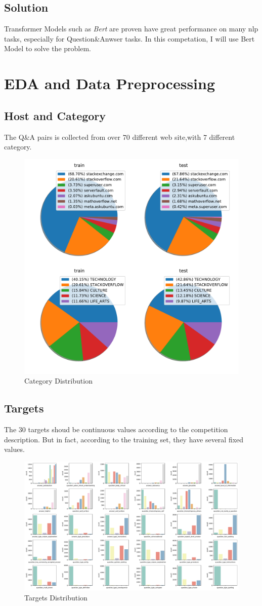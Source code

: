 \subsection{Solution}
Transformer Models such as \textit{Bert} are proven have great performance on many nlp tasks, especially for Question\&Anwser tasks.
In this competation, I will use Bert Model to solve the problem.
\newpage
\section{EDA and Data Preprocessing} \label{sec-eda}
\subsection{Host and Category}
The Q\&A pairs is collected from over 70 different web site,with 7 different category.
\begin{figure}[htbp]
    \centering
    \includegraphics[width=.5\linewidth]{figures/hosts_categories.pdf}
    \caption{Category Distribution}
    \label{fig:categories}
\end{figure}
\subsection{Targets}
The 30 targets shoud be continuous values according to the competition description.
But in fact, according to the training set, they have several fixed values.
\begin{figure}[htbp]
    \centering
    \centering
    \includegraphics[width=\linewidth]{figures/targets.pdf}
    \caption{Targets Distribution}
    \label{fig:targets}
\end{figure}
